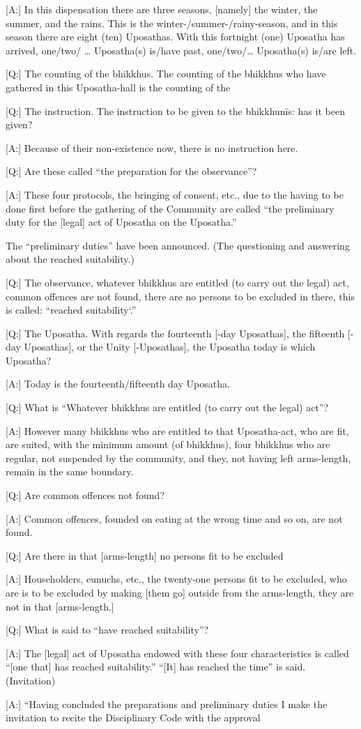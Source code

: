 [A:] In this dispensation there are three seasons, [namely] the winter,
the summer, and the rains.
This is the winter-/summer-/rainy-season, and in this season there are
eight (ten) Uposathas. With this fortnight (one) Uposatha has arrived,
one/two/ … Uposatha(s) is/have past, one/two/… Uposatha(s) is/are
left.

	[Q:] The counting of the bhikkhus. The counting of the bhikkhus
who have gathered in this Uposatha-hall is the counting of the

	[Q:] The instruction. The instruction to be given to the bhikkhunīs:
has it been given?

[A:] Because of their non-existence now, there is no instruction here.

	[Q:] Are these called “the preparation for the observance”?

[A:] These four protocols, the bringing of consent, etc., due to the
having to be done first before the gathering of the Community are
called “the preliminary duty for the [legal] act of Uposatha on the
Uposatha.”

The “preliminary duties” have been announced.
(The questioning and answering about the reached suitability.)

[Q:] The observance, whatever bhikkhus are entitled (to carry out the
legal) act, common offences are not found, there are no persons to be
excluded in there, this is called: “reached suitability`.”

[Q:] The Uposatha. With regards the fourteenth [-day Uposathas], the
fifteenth [-day Uposathas], or the Unity [-Uposathas], the Uposatha
today is which Uposatha?

[A:] Today is the fourteenth/fifteenth day Uposatha.

	[Q:] What is “Whatever bhikkhus are entitled (to carry out the legal)
act”?

[A:] However many bhikkhus who are entitled to that Uposatha-act,
who are fit, are suited, with the minimum amount (of bhikkhus), four
bhikkhus who are regular, not suspended by the community, and
they, not having left arms-length, remain in the same boundary.

	[Q:] Are common offences not found?

[A:] Common offences, founded on eating at the wrong time and so
on, are not found.

	[Q:] Are there in that [arms-length] no persons fit to be excluded

	[A:] Householders, eunuchs, etc., the twenty-one persons fit to be
excluded, who are is to be excluded by making [them go] outside from
the arms-length, they are not in that [arms-length.]

	[Q:] What is said to “have reached suitability”?

[A:] The [legal] act of Uposatha endowed with these four
characteristics is called “[one that] has reached suitability.” “[It] has
reached the time” is said.
(Invitation)

[A:] “Having concluded the preparations and preliminary duties I
make the invitation to recite the Disciplinary Code with the approval

